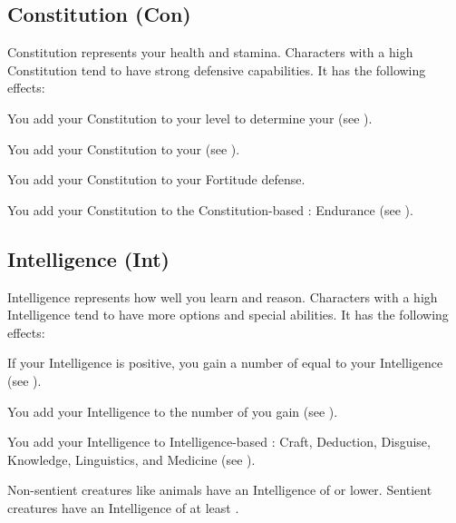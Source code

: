     \subsection{Constitution (Con)}\label{Constitution}
        {
            Constitution represents your health and stamina.
            Characters with a high Constitution tend to have strong defensive capabilities.
            It has the following effects:
            \begin{raggeditemize}
                \item You add your Constitution to your level to determine your  (see ).
                \item You add your Constitution to your  (see ).
                \item You add your Constitution to your Fortitude defense.
                \item You add your Constitution to the Constitution-based : Endurance (see ).
            \end{raggeditemize}
        }

    \subsection{Intelligence (Int)}\label{Intelligence}
        {
            Intelligence represents how well you learn and reason.
            Characters with a high Intelligence tend to have more options and special abilities.
            It has the following effects:

            \begin{raggeditemize}
                \item If your Intelligence is positive, you gain a number of  equal to your Intelligence (see ).
                \item You add your Intelligence to the number of  you gain (see ).
                \item You add your Intelligence to Intelligence-based : Craft, Deduction, Disguise, Knowledge, Linguistics, and Medicine (see ).
            \end{raggeditemize}

            \par Non-sentient creatures like animals have an Intelligence of  or lower.
            Sentient creatures have an Intelligence of at least .
        }

